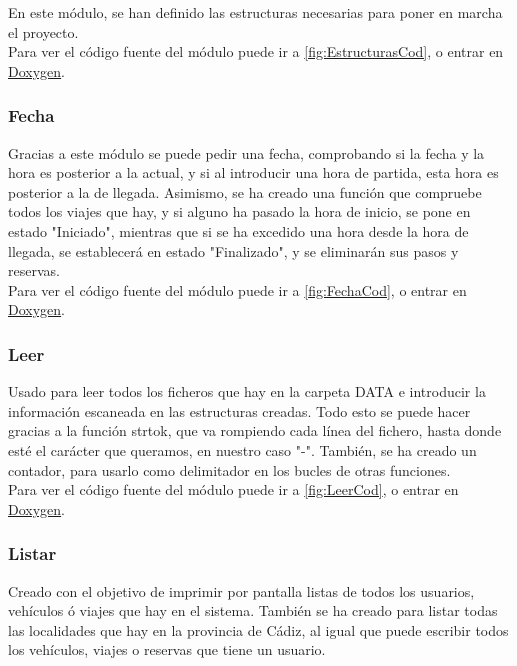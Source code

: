 En este módulo, se han definido las estructuras necesarias para poner en marcha el proyecto.\\

Para ver el código fuente del módulo puede ir a \ref{fig:EstructurasCod}, o entrar en \href{DOC_DOXYGEN/annotated.html}{Doxygen}.

\label{fig:Estructuras}

\subsubsection{Fecha}

Gracias a este módulo se puede pedir una fecha, comprobando si la fecha y la hora es posterior a la actual, y si al introducir una hora de partida,
esta hora es posterior a la de llegada. Asimismo, se ha creado una función que compruebe todos los viajes que hay, y si alguno ha pasado la hora de inicio, se pone en estado "Iniciado",
mientras que si se ha excedido una hora desde la hora de llegada, se establecerá en estado "Finalizado", y se eliminarán sus pasos y reservas.\\

Para ver el código fuente del módulo puede ir a \ref{fig:FechaCod}, o entrar en \href{DOC_DOXYGEN/fecha_8h_source.html}{Doxygen}.
\label{fig:Fecha}

\subsubsection{Leer}

Usado para leer todos los ficheros que hay en la carpeta DATA e introducir la información escaneada en las estructuras creadas. Todo esto se puede hacer gracias a la función strtok,
que va rompiendo cada línea del fichero, hasta donde esté el carácter que queramos, en nuestro caso "-".
También, se ha creado un contador, para usarlo como delimitador en los bucles de otras funciones.\\

Para ver el código fuente del módulo puede ir a \ref{fig:LeerCod}, o entrar en \href{DOC_DOXYGEN/leer_8h_source.html}{Doxygen}.
\label{fig:Leer}

\subsubsection{Listar}

Creado con el objetivo de imprimir por pantalla listas de todos los usuarios, vehículos ó viajes que hay en el sistema.
También se ha creado para listar todas las localidades que hay en la provincia de Cádiz, al igual que puede escribir todos los vehículos, viajes o reservas que tiene un usuario.\\

